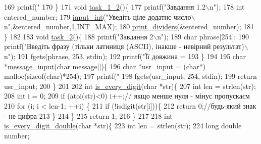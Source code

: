 \begin{DoxyCodeInclude}
{{169     printf(\textcolor{stringliteral}{"%
170 \}
171 \textcolor{keywordtype}{void} \hyperlink{main_8c_a97a9145d16ec992fa06404b068bd4e18}{task\_1\_2}()\{
177     printf(\textcolor{stringliteral}{"Завдання 1.2\(\backslash\)n"});
178     \textcolor{keywordtype}{int} entered\_number;
179     \hyperlink{main_8c_a6f453bc035d85e967bd5032eca31a155}{input\_int}(\textcolor{stringliteral}{"Уведіть ціле додатнє число\(\backslash\)n"},&entered\_number,1,INT\_MAX);
180     \hyperlink{main_8c_a2f5dd4f3afe9bea7f6dd19ed24cd9d16}{print\_dividers}(&entered\_number);
181 \}
182 
183 \textcolor{keywordtype}{void} \hyperlink{main_8c_a08570886a32f0508e2a3f23c4ea06339}{task\_2}()\{
188     printf(\textcolor{stringliteral}{"Завдання 2\(\backslash\)n"});
189     \textcolor{keywordtype}{char} phrase[254];
190     printf(\textcolor{stringliteral}{"Введіть фразу (тільки латиниця (ASCII), інакше - невірний результат)\(\backslash\)n"});
191     fgets(phrase, 253, stdin);
192     printf(\textcolor{stringliteral}{"Її довжина = %
193 \}
194 
195 \textcolor{keywordtype}{char} *\hyperlink{main_8c_a638293d509eded9d6ef7552ae1b17f2b}{message\_input}(\textcolor{keywordtype}{char} message[])\{
196     \textcolor{keywordtype}{char} *usr\_input = (\textcolor{keywordtype}{char}*) malloc(\textcolor{keyword}{sizeof}(\textcolor{keywordtype}{char})*254);
197     printf(\textcolor{stringliteral}{"%
198     fgets(usr\_input, 254, stdin);
199     \textcolor{keywordflow}{return} usr\_input;
200 \}
201 
202 \textcolor{keywordtype}{int} \hyperlink{main_8c_a9594b83ee908d195f5ff508da5c23c58}{is\_every\_digit}(\textcolor{keywordtype}{char} *str)\{
207     \textcolor{keywordtype}{int} len = strlen(str);
208     \textcolor{keywordtype}{int} i = 0;
209     \textcolor{keywordflow}{if} (atoi(str)<0) i++;\textcolor{comment}{// якщо менше нуля - мінус пропускаєм}
210     \textcolor{keywordflow}{for} (i; i < len-1; ++i) \{
211         \textcolor{keywordflow}{if} (!isdigit(str[i]))\{
212             \textcolor{keywordflow}{return} 0;\textcolor{comment}{//будь-який знак - не цифра}
213         \}
214     \}
215     \textcolor{keywordflow}{return} 1;
216 \}
217 
218 \textcolor{keywordtype}{int} \hyperlink{main_8c_a5d7849c249859dd438a37f1e6e5adf70}{is\_every\_digit\_double}(\textcolor{keywordtype}{char} *str)\{
223     \textcolor{keywordtype}{int} len = strlen(str);
224     \textcolor{keywordtype}{long} \textcolor{keywordtype}{double} number;
}}}}}
\end{DoxyCodeInclude}
